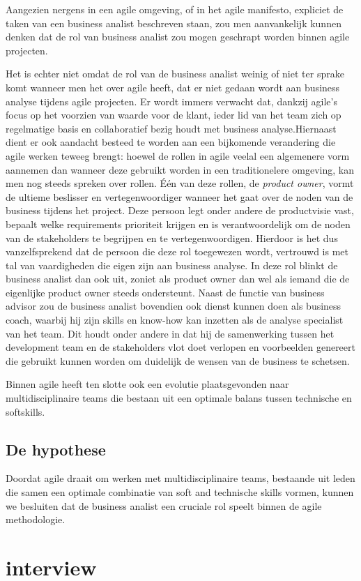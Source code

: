 \documentclass{hogent-article}
\begin{document}
Aangezien nergens in een agile omgeving, of in het agile manifesto, expliciet de taken van een business analist beschreven staan, zou men aanvankelijk kunnen denken dat de rol van business analist zou mogen geschrapt worden binnen agile projecten.

Het is echter niet omdat de rol van de business analist weinig of niet ter sprake komt wanneer men het over agile heeft, dat er niet gedaan wordt aan business analyse tijdens agile projecten. Er wordt immers verwacht dat, dankzij agile's focus op het voorzien van waarde voor de klant, ieder lid van het team zich op regelmatige basis en collaboratief bezig houdt met business analyse.Hiernaast dient er ook aandacht besteed te worden aan een bijkomende verandering die agile werken teweeg brengt: hoewel de rollen in agile veelal een algemenere vorm aannemen dan wanneer deze gebruikt worden in een traditionelere omgeving, kan men nog steeds spreken over rollen. Één van deze rollen, de \emph{product owner}, vormt de ultieme beslisser en vertegenwoordiger wanneer het gaat over de noden van de business tijdens het project. Deze persoon legt onder andere de productvisie vast, bepaalt welke requirements prioriteit krijgen en is verantwoordelijk om de noden van de stakeholders te begrijpen en te vertegenwoordigen. Hierdoor is het dus vanzelfsprekend dat de persoon die deze rol toegewezen wordt, vertrouwd is met  tal van vaardigheden die eigen zijn aan business analyse. In deze rol blinkt de business analist dan ook uit, zoniet als product owner dan wel als iemand die de eigenlijke product owner steeds ondersteunt. Naast de functie van business advisor zou de business analist bovendien ook dienst kunnen doen als business coach, waarbij hij zijn skills en know-how kan inzetten als de analyse specialist van het team. Dit houdt onder andere in dat hij de samenwerking tussen het development team en de stakeholders vlot doet verlopen en voorbeelden genereert die gebruikt kunnen worden om duidelijk de wensen van de business te schetsen.\autocite{mcdonald2017does}

Binnen agile heeft ten slotte ook een evolutie plaatsgevonden naar multidisciplinaire teams die bestaan uit een optimale balans tussen technische en softskills.\autocite{heijnerelevante}

\subsection{De hypothese}

Doordat agile draait om werken met multidisciplinaire teams, bestaande uit leden die samen een optimale combinatie van soft and technische skills vormen, kunnen we besluiten dat de business analist een cruciale rol speelt binnen de agile methodologie. 


\section{interview}








\printbibliography[heading=bibintoc]
\end{document}
